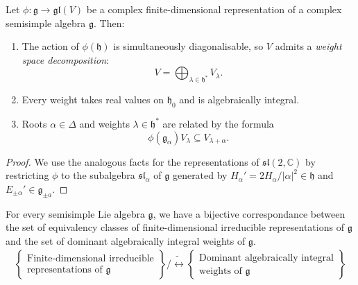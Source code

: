 \documentclass{report}
\begin{document}
\begin{lemma}
    Let $\phi : \mathfrak g \to \mathfrak{gl}(V)$ be a complex finite-dimensional representation of a complex semisimple algebra $\mathfrak g$.
    Then:
    \begin{enumerate}[label = (\roman*)]
        \item The action of $\phi(\mathfrak h)$ is simultaneously diagonalisable, so $V$ admits a \emph{weight space decomposition}:
        \[
        V = \bigoplus_{\lambda \in \mathfrak h^*} V_\lambda.
        \]
        \item Every weight takes real values on $\mathfrak h_0$ and is algebraically integral.
        \item Roots $\alpha \in \Delta$ and weights $\lambda \in \mathfrak h^*$ are related by the formula
        \[
        \phi(\mathfrak g_\alpha) V_\lambda \subseteq V_{\lambda + \alpha}.
        \]
    \end{enumerate}
\end{lemma}
\begin{proof}
    We use the analogous facts for the representations of $\mathfrak{sl}(2, \mathbb C)$ by restricting $\phi$ to the subalgebra $\mathfrak{sl}_\alpha$ of $\mathfrak g$ generated by $H_\alpha' = 2H_\alpha/|\alpha|^2 \in \mathfrak h$ and $E_{\pm \alpha}' \in \mathfrak g_{\pm a}$.
\end{proof}
\begin{theorem}
    For every semisimple Lie algebra $\mathfrak g$, we have a bijective correspondance between the set of equivalency classes of finite-dimensional irreducible representations of $\mathfrak g$ and the set of dominant algebraically integral weights of $\mathfrak g$.
    \begin{align*}
        \left\{ 
            \begin{array}{c}
                \text{Finite-dimensional irreducible} \\
                \text{representations of } \mathfrak g
            \end{array}
        \right\}/\tilde \leftrightarrow \left\{ 
            \begin{array}{c}
                \text{Dominant algebraically integral} \\
                \text{weights of } \mathfrak g
            \end{array}
        \right\}
    \end{align*}
\end{theorem}
\end{document}
